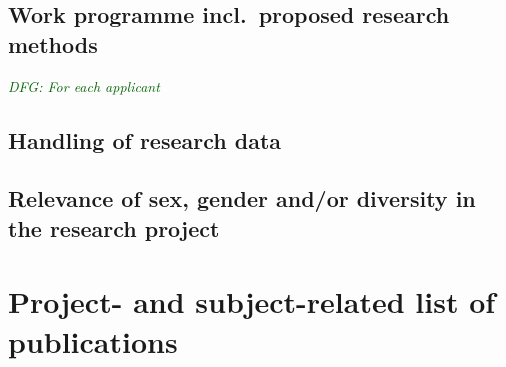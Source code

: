 \documentclass[a4paper,11pt]{amsart}
\theoremstyle{definition}
\newcommand{\<}{\langle}
\renewcommand{\>}{\rangle}
\newcommand{\dfg}[1]{\emph{\textcolor{darkgreen}{DFG: #1}}}
\begin{document}
\lipsum[5]

\subsection{Work programme incl.\ proposed research methods}
\dfg{For each applicant}

\lipsum[6]

\subsection{Handling of research data}

\lipsum[7]

\subsection{Relevance of sex, gender and/or diversity in the research project}

\lipsum[8]


\section{Project- and subject-related list of publications} \label{sec:bib}
\end{document}
